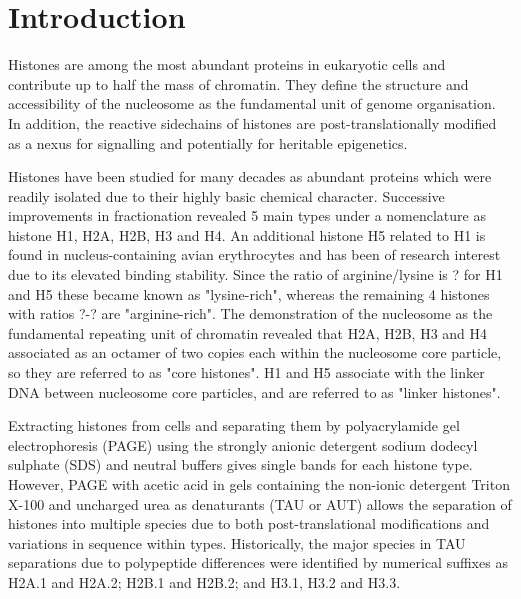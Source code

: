 \documentclass[10pt,a4paper,draft]{article}
\begin{document}
  \section{Introduction}
  \label{sec:intro}

	Histones are among the most abundant proteins in eukaryotic cells and contribute up to half the mass of chromatin. They define the structure and accessibility of the nucleosome as the fundamental unit of genome organisation. In addition, the reactive sidechains of histones are post-translationally modified as a nexus for signalling and potentially for heritable epigenetics.

	Histones have been studied for many decades as abundant proteins which were readily isolated due to their highly basic chemical character. Successive improvements in fractionation revealed 5 main types under a nomenclature as histone H1, H2A, H2B, H3 and H4. An additional histone H5 related to H1 is found in nucleus-containing avian erythrocytes and has been of research interest due to its elevated binding stability. Since the ratio of arginine/lysine is ? for H1 and H5 these became known as "lysine-rich", whereas the remaining 4 histones with ratios ?-? are "arginine-rich". The demonstration of the nucleosome as the fundamental repeating unit of chromatin revealed that H2A, H2B, H3 and H4 associated as an octamer of two copies each within the nucleosome core particle, so they are referred to as "core histones". H1 and H5 associate with the linker DNA between nucleosome core particles, and are referred to as "linker histones".

	Extracting histones from cells and separating them by polyacrylamide gel electrophoresis (PAGE) using the strongly anionic detergent sodium dodecyl sulphate (SDS) and neutral buffers gives single bands for each histone type. However, PAGE with acetic acid in gels containing the non-ionic detergent Triton X-100 and uncharged urea as denaturants (TAU or AUT) allows the separation of histones into multiple species due to both post-translational modifications and variations in sequence within types. Historically, the major species in TAU separations due to polypeptide differences were identified by numerical suffixes as H2A.1 and H2A.2; H2B.1 and H2B.2; and H3.1, H3.2 and H3.3.
\end{document}
